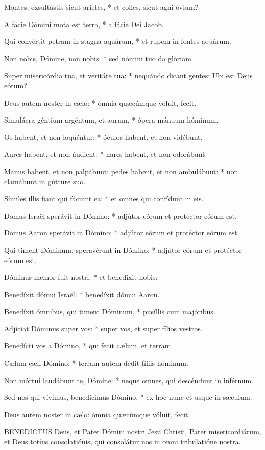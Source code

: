 Montes, exsultástis sicut aríetes, * et colles, sicut agni óvium?

A fácie Dómini mota est terra, * a fácie Dei Jacob.

Qui convértit petram in stagna aquárum, * et rupem in fontes aquárum.

Non nobis, Dómine, non nobis: * sed nómini tuo da glóriam.

Super misericórdia tua, et veritáte tua: * nequándo dicant gentes: Ubi est Deus eórum?

Deus autem noster in cælo: * ómnia quæcúmque vóluit, fecit.

Simulácra géntium argéntum, et aurum, * ópera mánuum hóminum.

Os habent, et non loquéntur: * óculos habent, et non vidébunt.

Aures habent, et non áudient: * nares habent, et non odorábunt.

Manus habent, et non palpábunt: pedes habent, et non ambulábunt: * non clamábunt in gútture suo.

Símiles illis fiant qui fáciunt ea: * et omnes qui confídunt in eis.

Domus Israël sperávit in Dómino: * adjútor eórum et protéctor eórum est.

Domus Aaron sperávit in Dómino: * adjútor eórum et protéctor eórum est.

Qui timent Dóminum, speravérunt in Dómino: * adjútor eórum et protéctor eórum est.

Dóminus memor fuit nostri: * et benedíxit nobis:

Benedíxit dómui Israël: * benedíxit dómui Aaron.

Benedíxit ómnibus, qui timent Dóminum, * pusíllis cum majóribus.

Adjíciat Dóminus super vos: * super vos, et super fílios vestros.

Benedícti vos a Dómino, * qui fecit cælum, et terram.

Cælum cæli Dómino: * terram autem dedit fíliis hóminum.

Non mórtui laudábunt te, Dómine: * neque omnes, qui descéndunt in inférnum.

Sed nos qui vívimus, benedícimus Dómino, * ex hoc nunc et usque in sæculum.

 Deus autem noster in cælo: ómnia quæcúmque vóluit, fecit.


\lettrine[lines=2]{B}{ENEDICTUS} Deus, et Pater Dómini nostri Jesu Christi, Pater misericordiárum, et Deus totíus consolatiónis, qui consolátur nos in omni tribulatióne nostra.

